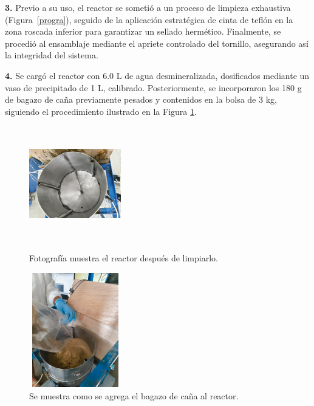 \documentclass[12pt]{article}
\begin{document}
			\textbf{3.}	Previo a su uso, el reactor se sometió a un proceso de limpieza exhaustiva (Figura~\ref{progra}), seguido de la aplicación estratégica de cinta de teflón en la zona roscada inferior para garantizar un sellado hermético. Finalmente, se procedió al ensamblaje mediante el apriete controlado del tornillo, asegurando así la integridad del sistema.
			
			
			
			\textbf{4.}	Se cargó el reactor con 6.0 L de agua desmineralizada, dosificados mediante un vaso de precipitado de 1 L, calibrado. Posteriormente, se incorporaron los 180 g de bagazo de caña previamente pesados y contenidos en la bolsa de 3 kg, siguiendo el procedimiento ilustrado en la Figura \ref{baciad}.
			

				\begin{figure}[H]
				\centering
				\begin{minipage}{0.46\textwidth}
					\centering
					\includegraphics[width=4cm, height=5cm]{imagenes/reactor limpio} %
					\caption{Fotografía muestra el reactor después de limpiarlo.}
					\label{progra}
				\end{minipage}
				\hfill
				\begin{minipage}{0.48\textwidth}
					\centering
					\includegraphics[width=4cm, height=5cm]{imagenes/biologico5} %
					\caption{Se muestra como se agrega el bagazo de caña al reactor.}
					\label{baciad}
				\end{minipage}
			\end{figure}
			
\end{document}
